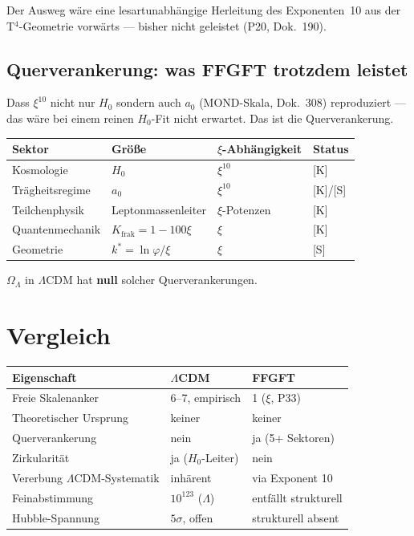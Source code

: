 \documentclass[11pt]{report}
\begin{document}
Der Ausweg wäre eine lesartunabhängige Herleitung des Exponenten~10
aus der T$^4$-Geometrie vorwärts — bisher nicht geleistet (P20, Dok.~190).

\section{Querverankerung: was FFGFT trotzdem leistet}

Dass $\xi^{10}$ nicht nur $H_0$ sondern auch $a_0$ (MOND-Skala,
Dok.~308) reproduziert — das wäre bei einem reinen $H_0$-Fit nicht
erwartet. Das ist die Querverankerung.

\begin{center}
\begin{tabular}{llll}
\toprule
Sektor & Größe & $\xi$-Abhängigkeit & Status \\
\midrule
Kosmologie & $H_0$ & $\xi^{10}$ & [K] \\
Trägheitsregime & $a_0$ & $\xi^{10}$ & [K]/[S] \\
Teilchenphysik & Leptonmassenleiter & $\xi$-Potenzen & [K] \\
Quantenmechanik & $K_\text{frak} = 1-100\xi$ & $\xi$ & [K] \\
Geometrie & $k^* = \ln\varphi/\xi$ & $\xi$ & [S] \\
\bottomrule
\end{tabular}
\end{center}

$\Omega_\Lambda$ in $\Lambda$CDM hat \textbf{null} solcher Querverankerungen.

\chapter{Vergleich}

\begin{center}
\begin{tabular}{lll}
\toprule
Eigenschaft & $\Lambda$CDM & FFGFT \\
\midrule
Freie Skalenanker & 6–7, empirisch & 1 ($\xi$, P33) \\
Theoretischer Ursprung & keiner & keiner \\
Querverankerung & nein & ja (5+ Sektoren) \\
Zirkularität & ja ($H_0$-Leiter) & nein \\
Vererbung $\Lambda$CDM-Systematik & inhärent & via Exponent 10 \\
Feinabstimmung & $10^{123}$ ($\Lambda$) & entfällt strukturell \\
Hubble-Spannung & $5\sigma$, offen & strukturell absent \\
\bottomrule
\end{tabular}
\end{center}
\end{document}
